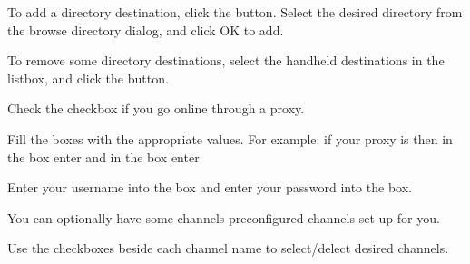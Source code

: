 To add a directory destination, click the 
 button. Select the desired directory 
from the browse directory dialog, and click OK to add. 

To remove some directory destinations, select the handheld destinations in 
the listbox, and click the  button.


Check the  checkbox if you
go online through a proxy. 

Fill the boxes with the appropriate values. For example: if your proxy is
 then in the 
box enter  and in the  box 
enter 


Enter your username into the  box and enter 
your password into the  box.



You can optionally have some channels preconfigured channels set up for you.

Use the checkboxes beside each channel name to select/delect desired channels.

